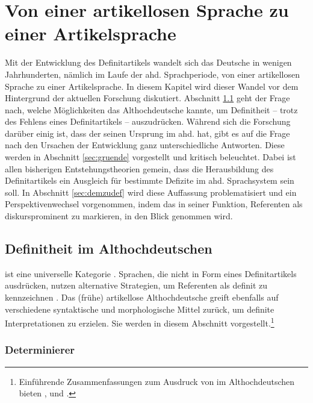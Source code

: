 \chapter{Von einer artikellosen Sprache zu einer Artikelsprache}\label{forschung}


Mit der Entwicklung des Definitartikels  wandelt sich das Deutsche in wenigen Jahrhunderten, nämlich im Laufe der ahd. Sprachperiode,  von einer artikellosen Sprache zu einer Artikelsprache. 
In diesem Kapitel wird dieser Wandel vor dem Hintergrund der aktuellen Forschung diskutiert. Abschnitt \ref{sec:def-ahd} geht der Frage nach, welche Möglichkeiten das Althochdeutsche kannte, um Definitheit -- trotz des Fehlens eines Definitartikels -- auszudrücken. Während sich die Forschung darüber einig ist, dass der  seinen Ursprung im ahd.   hat,
gibt es auf die Frage nach den Ursachen der Entwicklung ganz unterschiedliche Antworten. Diese werden in Abschnitt \ref{sec:gruende} vorgestellt und kritisch beleuchtet. Dabei ist allen bisherigen Entstehungstheorien gemein, dass die Herausbildung des Definitartikels  ein Ausgleich für bestimmte Defizite im ahd. Sprachsystem sein soll. In Abschnitt \ref{sec:demzudef} wird diese Auffassung problematisiert und ein Perspektivenwechsel vorgenommen, indem das   in seiner Funktion, Referenten als diskursprominent zu markieren, in den Blick genommen wird. 

\section{Definitheit im Althochdeutschen} \label{sec:def-ahd}

 ist eine universelle Kategorie \parencite[269]{Leiss2000}. Sprachen, die  nicht in Form eines Definitartikels  ausdrücken, nutzen alternative Strategien, um Referenten als definit zu kennzeichnen \parencite[für einen typologischen Überblick s.][]{Kramsky1972}. Das (frühe) artikellose Althochdeutsche greift ebenfalls auf verschiedene syntaktische und morphologische Mittel zurück, um definite Interpretationen zu erzielen. Sie werden in diesem Abschnitt vorgestellt.\footnote{Einführende Zusammenfassungen zum Ausdruck von  im Althochdeutschen bieten \textcite{Szczepaniak2011a}, \textcite{Ferraresi2014} und \textcite{Szczepaniak2015}.}

\subsection{Determinierer}\label{determinierer}

